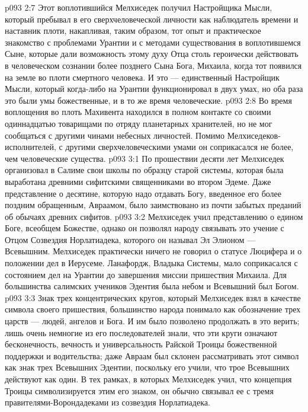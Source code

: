 \vs p093 2:7 \pc Этот воплотившийся Мелхиседек получил Настройщика Мысли, который пребывал в его сверхчеловеческой личности как наблюдатель времени и наставник плоти, накапливая, таким образом, тот опыт и практическое знакомство с проблемами Урантии и с методами существования в воплотившемся Сыне, которые дали возможность этому духу Отца столь героически действовать в человеческом сознании более позднего Сына Бога, Михаила, когда тот появился на земле во плоти смертного человека. И это --- единственный Настройщик Мысли, который когда\hyp{}либо на Урантии функционировал в двух умах, но оба раза это были умы божественные, и в то же время человеческие.
\vs p093 2:8 Во время воплощения во плоть Махивента находился в полном контакте со своими одиннадцатью товарищами по отряду планетарных хранителей, но не мог сообщаться с другими чинами небесных личностей. Помимо Мелхиседеков\hyp{}исполнителей, с другими сверхчеловеческими умами он соприкасался не более, чем человеческие существа.
\vs p093 3:1 По прошествии десяти лет Мелхиседек организовал в Салиме свои школы по образцу старой системы, которая была выработана древними сифитскими священниками во втором Эдеме. Даже представление о десятине, которую надо отдавать Богу, введенное его более поздним обращенным, Авраамом, было заимствовано из почти забытых преданий об обычаях древних сифитов.
\vs p093 3:2 Мелхиседек учил представлению о едином Боге, всеобщем Божестве, однако он позволял народу связывать это учение с Отцом Созвездия Норлатиадека, которого он называл Эл Элионом --- Всевышним. Мелхиседек практически ничего не говорил о статусе Люцифера и о положении дел в Иерусеме. Ланафордж, Владыка Системы, мало соприкасался с состоянием дел на Урантии до завершения миссии пришествия Михаила. Для большинства салимских учеников Эдентия была небом и Всевышний был Богом.
\vs p093 3:3 Знак трех концентрических кругов, который Мелхиседек взял в качестве символа своего пришествия, большинство народа понимало как обозначение трех царств --- людей, ангелов и Бога. И им было позволено продолжать в это верить; лишь очень немногие из его последователей знали, что эти круги означают бесконечность, вечность и универсальность Райской Троицы божественной поддержки и водительства; даже Авраам был склонен рассматривать этот символ как знак трех Всевышних Эдентии, поскольку его учили, что трое Всевышних действуют как один. В тех рамках, в которых Мелхиседек учил, что концепция Троицы символизируется этим его знаком, он обычно связывал ее с тремя правителями\hyp{}Ворондадеками из созвездия Норлатиадека.
